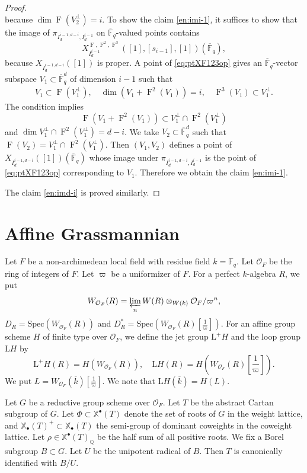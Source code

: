 \documentclass[12pt,a4paper]{article}
\DeclareMathOperator{\oF}{F}
\newcommand{\bF}{\mathbb{F}}
\newcommand{\bQ}{\mathbb{Q}}
\newcommand{\bX}{\mathbb{X}}
\newcommand{\cO}{\mathcal{O}}
\newcommand{\rL}{\mathrm{L}}
\newcommand{\ol}{\overline}
\begin{document}
\begin{proof}
\begin{equation*}
\end{equation*}
because $\dim \oF (V_2^{\perp})=i$. 
To show the claim \ref{en:imi-1}, 
it suffices to show that the image of $\pi_{I_{d}^{i-1,d-i},I_{d}^{i-1}}$ 
on $\ol{\bF}_{q}$-valued points contains 
\begin{equation}\label{eq:ptXF123op}
X_{I_{d}^{i-1}}^{\oF,\oF^2,\oF^3}([1],[s_{i-1}],[1])(\ol{\bF}_{q}), 
\end{equation}
because 
$X_{I_{d}^{i-1,d-i}}([1])$ is proper. 
A point of \eqref{eq:ptXF123op} gives 
an $\ol{\bF}_q$-vector subspace 
$V_1 \subset \ol{\bF}_q^d$ of dimension $i-1$ such that 
\begin{align}\label{eq:cdV1op}
 V_1 \subset \oF (V_1^{\perp}), \quad 
 \dim (V_1 +\oF^2 (V_1)) = i, \quad 
 \oF^3(V_1) \subset V_1^{\perp}. 
\end{align}
The condition 
implies 
\[
 \oF (V_1 +\oF^2(V_1)) \subset V_1^{\perp} \cap \oF^2(V_1^{\perp}) 
\]
and $\dim V_1^{\perp} \cap \oF^2(V_1^{\perp})=d-i$. 
We take $V_2 \subset \ol{\bF}_q^d$ such that 
$\oF (V_2) =V_1^{\perp} \cap \oF^2(V_1^{\perp})$. 
Then $(V_1,V_2)$ defines a point of 
$X_{I_{d}^{i-1,d-i}}([1])(\ol{\bF}_q)$ whose image under 
$\pi_{I_{d}^{i-1,d-i},I_{d}^{i-1}}$ is the point of 
\eqref{eq:ptXF123op} corresponding to $V_1$. 
Therefore we obtain the claim \ref{en:imi-1}. 

The claim \ref{en:imd-i} is proved similarly. 
\end{proof}

\section{Affine Grassmannian}\label{sec:AffG}

Let $F$ be a non-archimedean local field with residue field $k=\bF_q$. Let $\cO_F$ be the ring of integers of $F$.
Let $\varpi$ be a uniformizer of $F$. 
For a perfect $k$-algebra $R$, 
we put 
\[
 W_{\cO_F}(R)=\varprojlim_{n} W(R) \otimes_{W(k)} \cO_F /\varpi^n , 
\]
$D_R = \mathrm{Spec}(W_{\cO_F}(R) )$ and $D^*_R = \mathrm{Spec}(W_{\cO_F}(R)[\frac{1}{\varpi}] )$. 
For an affine group scheme $H$ of finite type over $\cO_F$, we define the jet group 
$\rL^+H$ and the loop group $\rL H$ by 
\[
 \rL^+H(R)=H(W_{\cO_F}(R)), \quad 
 \rL H(R)=H(W_{\cO_F}(R)[\frac{1}{\varpi}]). 
\]
We put $L=W_{\cO_F}(\ol{k})[\frac{1}{\varpi}]$. We note that 
$\rL H(\ol{k})=H(L)$. 

Let $G$ be a reductive group scheme over $\cO_F$. 
Let $T$ be the abstract Cartan subgroup of $G$. 
Let $\Phi \subset \bX^{\bullet}( T)$ denote the set of roots of $G$ in the weight lattice, and 
$\bX_{\bullet}( T)^+ \subset \bX_{\bullet}( T)$ the semi-group of dominant coweights in the coweight lattice. 
Let $\rho \in \bX^{\bullet}(T)_{\bQ}$ be the half sum of all positive roots. 
We fix a Borel subgroup $B \subset G$. 
Let $U$ be the unipotent radical of $B$. 
Then $T$ is canonically identified with $B/U$. 
\end{document}
